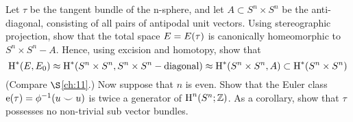 \documentclass[../main]{subfiles}
\begin{document}
\begin{problem}\label{pro:9-C}Let $\tau$ be the tangent bundle of the n-sphere, and let $A \subset S^{n} \times S^{n}$ be the anti-diagonal, consisting of all pairs of antipodal unit vectors. Using stereographic projection, show that the total space $E=E(\tau)$ is canonically homeomorphic to $S^{n} \times S^{n}-A$. Hence, using excision and homotopy, show that \[\operatorname{H}^{*}(E, E_{0}) \approx \operatorname{H}^{*}(S^{n} \times S^{n}, S^{n} \times S^{n}-\text{diagonal}) \approx \operatorname{H}^{*}(S^{n} \times S^{n}, A) \subset \operatorname{H}^{*}(S^{n} \times S^{n})\]
(Compare $\S$\ref{ch:11}.) Now suppose that $n$ is even. Show that the Euler class \newline
$\operatorname{e}(\tau)=\phi^{-1}(u \smile u)$ is twice a generator of $\operatorname{H}^{n}(S^{n} ; \mathbb{Z})$. As a corollary, show that $\tau$ possesses no non-trivial sub vector bundles.

\end{problem}
\end{document}
